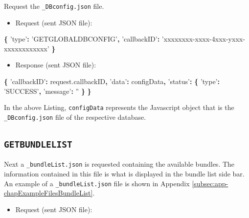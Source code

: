\documentclass[]{book}
\newenvironment{Shaded}{\begin{snugshade}}{\end{snugshade}}
\newcommand{\AttributeTok}[1]{\textcolor[rgb]{0.77,0.63,0.00}{#1}}
\newcommand{\NormalTok}[1]{#1}
\newcommand{\OperatorTok}[1]{\textcolor[rgb]{0.81,0.36,0.00}{\textbf{#1}}}
\newcommand{\StringTok}[1]{\textcolor[rgb]{0.31,0.60,0.02}{#1}}
\newcommand{\VariableTok}[1]{\textcolor[rgb]{0.00,0.00,0.00}{#1}}
\providecommand{\tightlist}{%
  \setlength{\itemsep}{0pt}\setlength{\parskip}{0pt}}
\theoremstyle{definition}
\theoremstyle{definition}
\theoremstyle{definition}
\theoremstyle{remark}
\begin{document}
Request the \texttt{\_DBconfig.json} file.

\begin{itemize}
\tightlist
\item
  Request (sent JSON file):
\end{itemize}

\begin{Shaded}
\begin{Highlighting}[]
\OperatorTok{\{}
  \StringTok{'type'}\OperatorTok{:} \StringTok{'GETGLOBALDBCONFIG'}\OperatorTok{,}
  \StringTok{'callbackID'}\OperatorTok{:} \StringTok{'xxxxxxxx-xxxx-4xxx-yxxx-xxxxxxxxxxxx'}
\OperatorTok{\}}
\end{Highlighting}
\end{Shaded}

\begin{itemize}
\tightlist
\item
  Response (sent JSON file):
\end{itemize}

\begin{Shaded}
\begin{Highlighting}[]
\OperatorTok{\{}
  \StringTok{'callbackID'}\OperatorTok{:} \VariableTok{request}\NormalTok{.}\AttributeTok{callbackID}\OperatorTok{,}
  \StringTok{'data'}\OperatorTok{:}\NormalTok{ configData}\OperatorTok{,}
  \StringTok{'status'}\OperatorTok{:} \OperatorTok{\{}
    \StringTok{'type'}\OperatorTok{:} \StringTok{'SUCCESS'}\OperatorTok{,}
    \StringTok{'message'}\OperatorTok{:} \StringTok{''}
  \OperatorTok{\}}
\OperatorTok{\}}
\end{Highlighting}
\end{Shaded}

In the above Listing, \texttt{configData} represents the Javascript
object that is the \texttt{\_DBconfig.json} file of the respective
database.

\hypertarget{getbundlelist}{%
\subsection{\texorpdfstring{\texttt{GETBUNDLELIST}}{GETBUNDLELIST}}\label{getbundlelist}}

Next a \texttt{\_bundleList.json} is requested containing the available
bundles. The information contained in this file is what is displayed in
the bundle list side bar. An example of a \texttt{\_bundleList.json}
file is shown in Appendix \ref{subsec:app-chapExampleFilesBundleList}.

\begin{itemize}
\tightlist
\item
  Request (sent JSON file):
\end{itemize}
\end{document}
